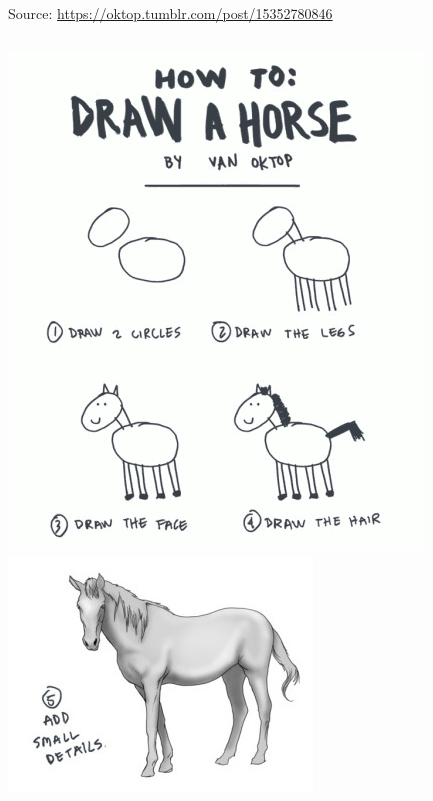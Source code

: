 \documentclass[aspectratio=169,usenames,dvipsnames]{beamer}
\begin{document}
\begin{frame}
    \begin{reference}
        \scriptsize\vspace{1em}
        \hfill Source: \url{https://oktop.tumblr.com/post/15352780846}
    \end{reference}
    \begin{columns}[b]
            \includegraphics[height=0.9\textheight]{fig/horse1}
        \pause
            \includegraphics[width=0.9\linewidth]{fig/horse2}
    \end{columns}
\end{frame}
\end{document}
